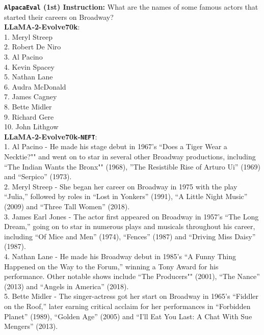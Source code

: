 \documentclass{article} %
\newcommand{\neft}{\texttt{NEFT}}
\newcommand{\llama}{LLaMA}
\begin{document}
\begin{tcolorbox}[breakable,boxrule=0pt]
\textbf{\texttt{AlpacaEval} (1st) Instruction:} What are the names of some famous actors that started their careers on Broadway? \\
\textbf{\llama{}-2-Evolve70k}: \\
1. Meryl Streep \\
2. Robert De Niro \\
3. Al Pacino \\
4. Kevin Spacey \\ 
5. Nathan Lane \\
6. Audra McDonald \\ 
7. James Cagney \\
8. Bette Midler \\
9. Richard Gere \\
10. John Lithgow \\
\textbf{\llama{}-2-Evolve70k-\neft}: \\
1. Al Pacino - He made his stage debut in 1967's ``Does a Tiger Wear a Necktie?"" and went on to star in several other Broadway productions, including ``The Indian Wants the Bronx"" (1968), ''The Resistible Rise of Arturo Ui'' (1969) and ``Serpico'' (1973). \\
2. Meryl Streep - She began her career on Broadway in 1975 with the play ``Julia,'' followed by roles in ``Lost in Yonkers'' (1991), ``A Little Night Music'' (2009) and ``Three Tall Women'' (2018). \\
3. James Earl Jones - The actor first appeared on Broadway in 1957's ``The Long Dream,'' going on to star in numerous plays and musicals throughout his career, including ``Of Mice and Men'' (1974), ``Fences'' (1987) and ``Driving Miss Daisy'' (1987). \\
4. Nathan Lane - He made his Broadway debut in 1985's ``A Funny Thing Happened on the Way to the Forum,'' winning a Tony Award for his performance. Other notable shows include ``The Producers"" (2001), ``The Nance'' (2013) and ``Angels in America'' (2018). \\
5. Bette Midler - The singer-actress got her start on Broadway in 1965's ``Fiddler on the Roof,'' later earning critical acclaim for her performances in ``Forbidden Planet'' (1989), ``Golden Age'' (2005) and ``I'll Eat You Last: A Chat With Sue Mengers'' (2013). \\

\end{tcolorbox}
\end{document}
